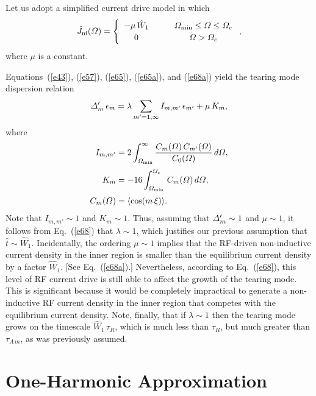 \documentclass[12pt,prb,aps]{revtex4-1}
\begin{document}
Let us adopt a simplified current drive model in which 
\begin{equation}\label{e68a}
\hat{J}_{\rm ni}({\mit\Omega}) = \left\{
\begin{array}{ccc} -\mu\,\hat{W}_1&~~~&{\mit\Omega}_{\rm min}\leq {\mit\Omega} \leq {\mit\Omega}_c\\[0.5ex]
0&&{\mit\Omega}>{\mit\Omega}_c\end{array}\right.,
\end{equation}
where $\mu$ is a constant. 

Equations~(\ref{e43}), (\ref{e57}), (\ref{e65}), (\ref{e65a}), and (\ref{e68a}) yield the tearing mode dispersion relation
\begin{equation}\label{e68}
{\mit\Delta}_m'\,\epsilon_m = \lambda\sum_{m'=1,\infty}I_{m,m'}\,\epsilon_{m'} + \mu\,K_m,
\end{equation}
where 
\begin{align}
I_{m,m' } &= 2\int_{{\mit\Omega}_{\rm min}}^\infty\frac{C_m({\mit\Omega})\,C_{m'}({\mit\Omega})}{C_0({\mit\Omega})}\,d{\mit\Omega},\\[0.5ex]
K_m &= -16\int_{{\mit\Omega}_{\rm min}}^{\mit\Omega_c}\,C_m({\mit\Omega})
\,d{\mit\Omega},\label{e70}\\[0.5ex]
C_m({\mit\Omega})& = \langle\cos(m\,\xi)\rangle.\label{e72}
\end{align}
Note  that $I_{m,m'}\sim 1$ and $K_m\sim 1$. Thus, assuming
that ${\mit\Delta}_m'\sim 1$ and $\mu\sim 1$, it follows from Eq.~(\ref{e68}) that $\lambda\sim 1$, which justifies our previous assumption that $\hat{t}\sim \hat{W}_1$. Incidentally, the ordering  $\mu\sim 1$ implies that the
RF-driven non-inductive  current density in the inner region is smaller than the equilibrium current density by a factor $\hat{W}_1$.
[See Eq.~(\ref{e68a}).]
Nevertheless, according to Eq.~(\ref{e68}), this level of RF current drive is still able to affect the growth of the tearing mode. 
This is significant because it would be completely impractical to generate a non-inductive RF current density
in the inner region that competes with the equilibrium current density.  Note, finally, that if $\lambda\sim 1$ then the tearing mode grows on the timescale $\hat{W}_1\,\tau_R$, which is much less than $\tau_R$, but much greater than
$\tau_{A\,m}$, as was previously assumed. 

\section{One-Harmonic Approximation}\label{s1}
\end{document}
